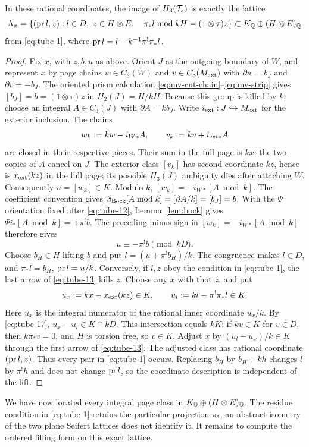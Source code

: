 \begin{lemma}\label{lem:lattice}
In these rational coordinates, the image of \(H_3(\mathcal T_s)\) is exactly
the lattice
\[
\Lambda_\pi=
\left\{(\operatorname{pr} l,z): l\in D,\ z\in H\otimes E,\quad
\pi_*l\bmod kH=(1\otimes\tau)z\right\}
\subset K_\mathbb Q\oplus(H\otimes E)_\mathbb Q
\]
from \eqref{eq:tube-1}, where
\(\operatorname{pr} l=l-k^{-1}\pi^!\pi_*l\).
\end{lemma}
\begin{proof}
Fix \(x\), with \(z,b,u\) as above. Orient \(J\) as the outgoing
boundary of \(W\), and represent \(x\)
by page chains \(w\in C_3(W)\) and
\(v\in C_3(M_{\rm ext})\) with
\(\partial w=b_J\) and \(\partial v=-b_J\).
The oriented prism calculation \eqref{eq:mv-cut-chain}--\eqref{eq:mv-strip}
gives \([b_J]=b=(1\otimes\tau)z\) in
\(H_2(J)=H/kH\). Because this
group is killed by \(k\), choose an
integral \(A\in C_3(J)\) with
\(\partial A=k b_J\). Write
\(i_{\rm ext}:J\hookrightarrow M_{\rm ext}\) for the exterior inclusion.
The chains
\begin{equation}
 w_k:=kw-i_{W*}A,\qquad
 v_k:=kv+i_{{\rm ext}*}A
\label{eq:tube-16a}
\end{equation}
are closed in their respective pieces.
Their sum in the full page is \(kx\):
the two copies of \(A\) cancel on \(J\).
The exterior class \([v_k]\) has
second coordinate \(kz\), hence is
\(x_{\rm ext}(kz)\) in the full page;
its possible \(H_3(J)\) ambiguity dies
after attaching \(W\). Consequently
\(u=[w_k]\in K\). Modulo \(k\),
\([w_k]=-i_{W*}[A\bmod k]\).
The coefficient convention gives
\(\beta_{\rm Bock}[A\bmod k]=[\partial A/k]=[b_J]=b\).
With the \(\Psi\) orientation fixed after
\eqref{eq:tube-12}, Lemma~\ref{lem:bock}
gives \(\Psi i_*[A\bmod k]=+\pi^!b\).
The preceding minus sign in
\([w_k]=-i_{W*}[A\bmod k]\) therefore gives
\begin{equation}
 u\equiv-\pi^!b\pmod{kD}.
\label{eq:tube-17}
\end{equation}
Choose \(b_H\in H\) lifting \(b\) and put
\(l=(u+\pi^!b_H)/k\). The congruence makes
\(l\in D\), and
\(\pi_*l=b_H\), \(\operatorname{pr} l=u/k\).
Conversely, if \(l,z\) obey the condition in
\eqref{eq:tube-1}, the last arrow of \eqref{eq:tube-13} kills \(z\).
Choose any \(x\) with that \(z\), and put
\[
u_x:=kx-x_{\rm ext}(kz)\in K,\qquad
u_l:=kl-\pi^!\pi_*l\in K.
\]
Here \(u_x\) is the integral numerator of the rational inner
coordinate \(u_x/k\).
By \eqref{eq:tube-17}, \(u_x-u_l\in K\cap kD\).
This intersection equals \(kK\):
if \(kv\in K\) for \(v\in D\), then
\(k\pi_*v=0\), and \(H\) is torsion free,
so \(v\in K\). Adjust \(x\) by
\((u_l-u_x)/k\in K\) through the first
arrow of \eqref{eq:tube-13}. The adjusted class has
rational coordinate \((\operatorname{pr} l,z)\).
Thus every pair in \eqref{eq:tube-1} occurs.
Replacing \(b_H\) by
\(b_H+kh\) changes \(l\) by \(\pi^!h\) and
does not change \(\operatorname{pr} l\), so the coordinate
description is independent of the lift.
\end{proof}

We have now located every integral page class in
\(K_{\mathbb Q}\oplus(H\otimes E)_{\mathbb Q}\). The residue condition in
\eqref{eq:tube-1} retains the particular projection \(\pi_*\);
an abstract isometry of the two plane Seifert lattices does not
identify it. It remains to compute the ordered filling form on
this exact lattice.
